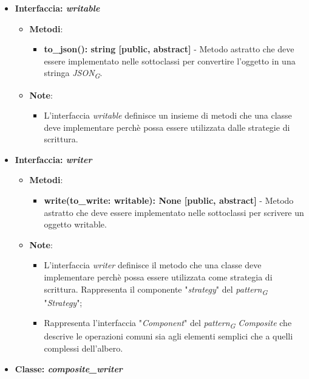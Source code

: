 \begin{itemize}
    \item{\textbf{Interfaccia: \textit{writable}}}
    \begin{itemize}
        \item\textbf{Metodi}: 
        \begin{itemize}
            \item \textbf{to\_json(): string [public, abstract]} - Metodo astratto che deve essere implementato nelle sottoclassi per convertire l'oggetto in una stringa \textit{JSON}\textsubscript{\textit{G}}.
        \end{itemize}
        \item\textbf{Note}:
        \begin{itemize}
            \item L'interfaccia \textit{writable} definisce un insieme di metodi che una classe deve implementare perchè possa essere utilizzata dalle strategie di scrittura.
        \end{itemize}
    \end{itemize}
    \item{\textbf{Interfaccia: \textit{writer}}}
     \begin{itemize}
        \item \textbf{Metodi}:
         \begin{itemize}
            \item \textbf{write(to\_write: writable): None [public, abstract]} - Metodo astratto che deve essere implementato nelle sottoclassi per scrivere un oggetto writable.
        \end{itemize}
        \item\textbf{Note}:
        \begin{itemize}
            \item L'interfaccia \textit{writer} definisce il metodo che una classe deve implementare perchè possa essere utilizzata come strategia di scrittura. Rappresenta il componente "\textit{strategy}" del \textit{pattern}\textsubscript{\textit{G}} "\textit{Strategy}";
            \item Rappresenta l'interfaccia "\textit{Component}" del \textit{pattern}\textsubscript{\textit{G}} \textit{Composite} che descrive le operazioni comuni sia agli elementi semplici che a quelli complessi dell'albero.
        \end{itemize}
    \end{itemize}
    \item{\textbf{Classe: \textit{composite\_writer}}}

\end{itemize}
